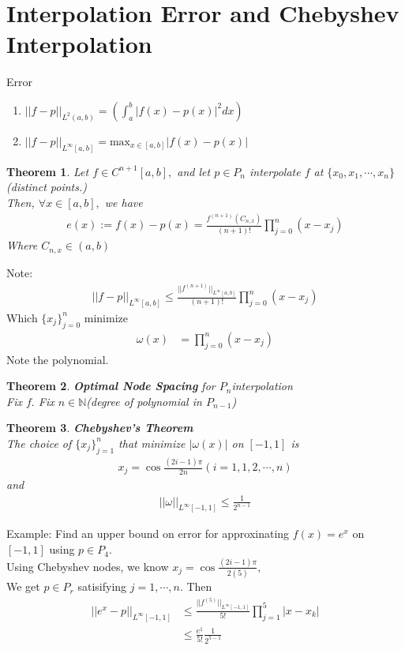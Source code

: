 \documentclass[11pt,oneside]{book}
\theoremstyle{break}
\theoremstyle{break}
\newtheorem{thm}{Theorem}[section]
\newcommand{\N}{\mathbb{N}}
\newcommand{\note}{\color{red}Note: \color{black}}
\newcommand{\example}{\color{purple}Example: \color{black}}
\begin{document}
\section[Interpolation Error and Chebyshev Interpolation]{Interpolation Error and Chebyshev Interpolation}
Error \begin{enumerate}
\item $||f-p||_{L^2(a,b)}=\left(\int_{a}^b |f(x)-p(x)|^2dx \right)$
\item $||f-p||_{L^{\infty}[a,b]}=\text{max}_{x\in [a,b]}|f(x)-p(x)|$
\end{enumerate}
\begin{thm}
Let $f\in C^{n+1}[a,b],$ and let $p\in P_n$ interpolate $f$ at $\{x_0,x_1,\cdots,x_n\}$ (distinct points.)\\
Then, $\forall x\in [a,b],$ we have \begin{align*}
e(x):=f(x)-p(x)=\frac{f^{(n+1)}(C_{n,x})}{(n+1)!}\prod_{j=0}^{n}(x-x_j)
\end{align*}
Where $C_{n,x}\in (a,b)$
\end{thm}
\note \begin{align*}
||f-p||_{L^{\infty}[a,b]}\leq \frac{||f^{(n+1)}||_{L^{\infty}[a,b]}}{(n+1)!}\prod_{j=0}^{n}(x-x_j)
\end{align*}
Which $\{x_j\}^n_{j=0}$ minimize \begin{align*}
\omega(x)&=\prod_{j=0}^{n}(x-x_j)
\end{align*}
Note the polynomial.
\begin{thm}
\textbf{Optimal Node Spacing} for $P_n$interpolation\\
Fix $f.$ Fix $n\in \N$(degree of polynomial in $P_{n-1}$)
\end{thm}
\begin{thm}
\textbf{Chebyshev's Theorem}\\
The choice of $\{x_j\}^n_{j=1}$ that minimize $|\omega(x)|$ on $[-1,1]$ is \begin{align*}
x_j=\cos \frac{(2i-1)\pi}{2n}(i=1,1,2,\cdots,n)
\end{align*}
and \begin{align*}
||\omega||_{L^{\infty}[-1,1]}\leq \frac{1}{2^{n-1}}
\end{align*}
\end{thm}
\example Find an upper bound on error for approxinating $f(x)=e^x$ on $[-1,1]$ using $p\in P_4$.\\
\hfill Using Chebyshev nodes, we know $x_j=\cos \frac{(2i-1)\pi}{2(5)},$\\
We get $p\in P_r$ satisifying $j=1,\cdots,n$. Then \begin{align*}
||e^x-p||_{L^{\infty}[-1,1]}&\leq \frac{||f^{(5)}||_{L^{\infty}[-1,1]}}{5!}\prod_{j=1}^{5}|x-x_k|\\
&\leq \frac{e^{1}}{5!}\frac{1}{2^{5-1}}
\end{align*} 
\end{document}
